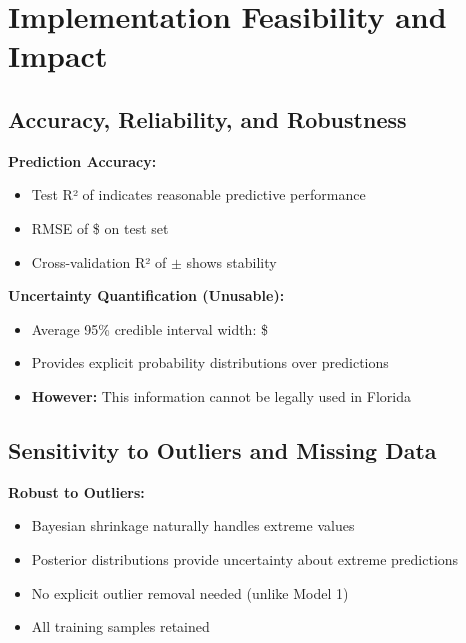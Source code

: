 
\section{Implementation Feasibility and Impact}

\subsection{Accuracy, Reliability, and Robustness}

\textbf{Prediction Accuracy:}
\begin{itemize}
    \item Test R² of \ModelEightRSquaredTest{} indicates reasonable predictive performance
    \item RMSE of \$\ModelEightRMSETest{} on test set
    \item Cross-validation R² of \ModelEightCVMean{} $\pm$ \ModelEightCVStd{} shows stability
\end{itemize}

\textbf{Uncertainty Quantification (Unusable):}
\begin{itemize}
    \item Average 95\% credible interval width: \$\ModelEightAvgCredibleWidth{}
    \item Provides explicit probability distributions over predictions
    \item \textbf{However:} This information cannot be legally used in Florida
\end{itemize}

\subsection{Sensitivity to Outliers and Missing Data}

\textbf{Robust to Outliers:}
\begin{itemize}
    \item Bayesian shrinkage naturally handles extreme values
    \item Posterior distributions provide uncertainty about extreme predictions
    \item No explicit outlier removal needed (unlike Model 1)
    \item All \ModelEightTrainingSamples{} training samples retained
\end{itemize}

